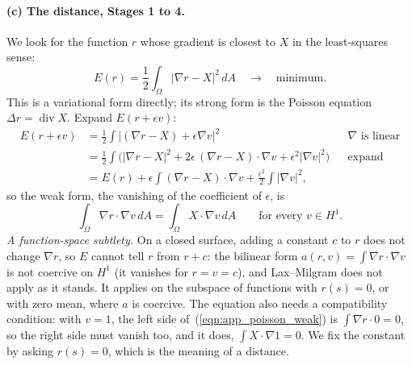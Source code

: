 \paragraph{(c) The distance, Stages 1 to 4.} We look for the function $r$ whose gradient is closest to $X$ in the least-squares sense:
\begin{equation*}
E(r) = \frac12\int_\Omega |\nabla r - X|^2\, dA \quad\longrightarrow\quad \text{minimum}.
\end{equation*}
This is a variational form directly; its strong form is the Poisson equation $\Delta r = \operatorname{div} X$. Expand $E(r + \epsilon v)$:
\begin{align*}
E(r + \epsilon v) &= \frac12\int |(\nabla r - X) + \epsilon\nabla v|^2 && \nabla \text{ is linear} \\
&= \frac12\int\big(|\nabla r - X|^2 + 2\epsilon\,(\nabla r - X)\cdot\nabla v + \epsilon^2|\nabla v|^2\big) && \text{expand} \\
&= E(r) + \epsilon\int(\nabla r - X)\cdot\nabla v + \frac{\epsilon^2}{2}\int|\nabla v|^2 ,
\end{align*}
so the weak form, the vanishing of the coefficient of $\epsilon$, is
\begin{equation}
\label{eqn:app_poisson_weak}
\int_\Omega \nabla r\cdot\nabla v\, dA = \int_\Omega X\cdot\nabla v\, dA \qquad\text{for every } v \in H^1 .
\end{equation}
\emph{A function-space subtlety.} On a closed surface, adding a constant $c$ to $r$ does not change $\nabla r$, so $E$ cannot tell $r$ from $r + c$: the bilinear form $a(r, v) = \int\nabla r\cdot\nabla v$ is not coercive on $H^1$ (it vanishes for $r = v = c$), and Lax--Milgram does not apply as it stands. It applies on the subspace of functions with $r(s) = 0$, or with zero mean, where $a$ is coercive. The equation also needs a compatibility condition: with $v = 1$, the left side of~(\ref{eqn:app_poisson_weak}) is $\int\nabla r\cdot 0 = 0$, so the right side must vanish too, and it does, $\int X\cdot\nabla 1 = 0$. We fix the constant by asking $r(s) = 0$, which is the meaning of a distance.

